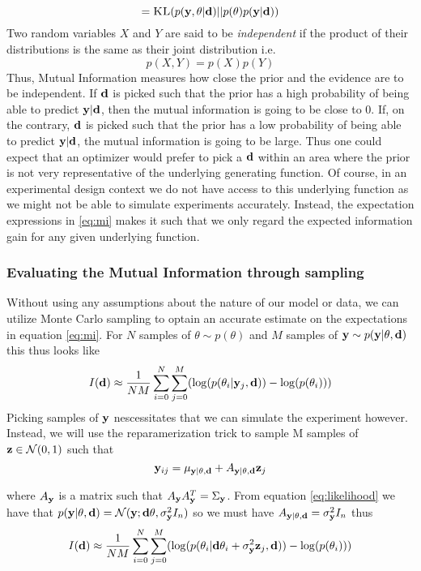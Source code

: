 $$ = \textsc{KL}(p(\mathbf{y}, \theta | \mathbf{d})|| p(\theta)p(\mathbf{y}|\mathbf{d}))$$
Two random variables $X$ and $Y$ are said to be \textit{independent} if the product of their distributions is the same as their joint distribution i.e.
\begin{equation}p(X,Y) = p(X)p(Y)\end{equation}
Thus, Mutual Information measures how close the prior and the evidence are to be independent. 
If $\mathbf{d}$ is picked such that the prior has a high probability of being able to predict $\mathbf{y}|\mathbf{d}$, then the mutual information is going to be close to 0. 
If, on the contrary, $\mathbf{d}$ is picked such that the prior has a low probability of being able to predict $\mathbf{y}|\mathbf{d}$, the mutual information is going to be large.
Thus one could expect that an optimizer would prefer to pick a $\mathbf{d}$ within an area where the prior is not very representative of the underlying generating function.
Of course, in an experimental design context we do not have access to this underlying function as we might not be able to simulate experiments accurately. Instead, the expectation expressions in \ref{eq:mi}
makes it such that we only regard the expected information gain for any given underlying function.

\subsubsection{Evaluating the Mutual Information through sampling}
Without using any assumptions about the nature of our model or data, we can utilize Monte Carlo sampling to optain an accurate estimate on the expectations in equation \ref{eq:mi}.
For $N$ samples of $\theta \sim p(\theta)$ and $M$ samples of $\mathbf{y} \sim p(\mathbf{y} | \theta, \mathbf{d})$ this thus looks like
\begin{equation}
  I(\mathbf{d}) \approx \frac{1}{NM}\sum_{i=0}^N\sum_{j=0}^M(\log (p(\theta_i | \mathbf{y}_j, \mathbf{d})) - \log(p(\theta_i)))
\end{equation}
Picking samples of $\mathbf{y}$ nescessitates that we can simulate the experiment however.
Instead, we will use the reparamerization trick to sample M samples of $\mathbf{z}\in \mathcal{N}(0, 1)$ such that
\begin{equation}
  \mathbf{y}_{ij} = \mu_{\mathbf{y}| \theta, \mathbf{d}} + A_{\mathbf{y}| \theta, \mathbf{d}}\mathbf{z}_j
\end{equation}

where $A_{\mathbf{y}}$ is a matrix such that $A_{\mathbf{y}}A_{\mathbf{y}}^T = \Sigma_{\mathbf{y}}$. 
From equation \ref{eq:likelihood} we have that $p(\mathbf{y}| \theta, \mathbf{d}) = \mathcal{N}(\mathbf{y}; \mathbf{d}\theta, \sigma^2_{\mathbf{y}}I_n)$ so we must have $A_{\mathbf{y}|\theta, \mathbf{d}} = \sigma^2_{\mathbf{y}}I_n$
thus 
\begin{equation}
  \label{eq:mi-sampled}
  I(\mathbf{d}) \approx \frac{1}{NM}\sum_{i=0}^N\sum_{j=0}^M(\log (p(\theta_i | \mathbf{d} \theta_i + \sigma^2_{\mathbf{y}}\mathbf{z}_j, \mathbf{d})) - \log(p(\theta_i)))
\end{equation}

